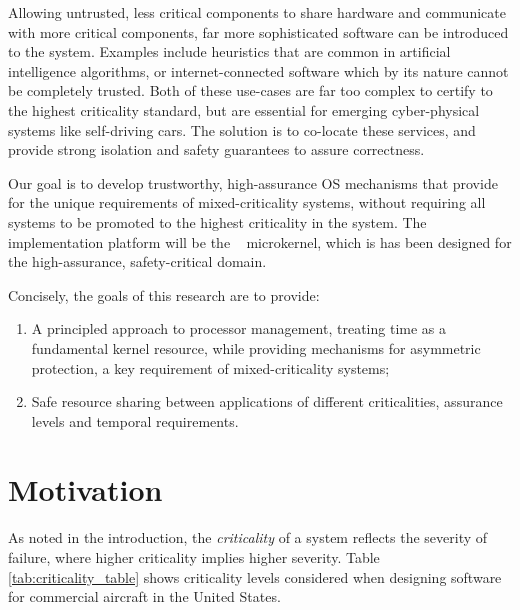 Allowing untrusted, less critical components to
share hardware and communicate with more critical components, far more sophisticated software can be
introduced to the system. Examples include heuristics that are common in artificial
intelligence algorithms, or internet-connected software which by its nature cannot be completely
trusted. Both of these use-cases are far too complex to certify to the highest criticality standard,
but are essential for emerging cyber-physical systems like self-driving cars. The solution is to
co-locate these services, and provide strong isolation and safety guarantees to assure
correctness.

Our goal is to develop trustworthy, high-assurance \gls{OS} mechanisms that provide for the unique
requirements of mixed-criticality systems, without requiring all systems to be promoted to the highest
criticality in the system. 
The implementation platform will be the \selfour~\citep{Klein_EHACDEEKNSTW_09}
microkernel, which is has been designed for the high-assurance, safety-critical domain.

Concisely, the goals of this research are to provide:
\begin{enumerate}[label=\textbf{G\arabic*}] 
    \item\label{G1} A principled approach to
    processor management, treating time as a fundamental kernel resource, while
    providing mechanisms for asymmetric protection, a key requirement of mixed-criticality systems;
\item\label{G2} Safe resource sharing between applications of different criticalities, assurance levels and
    temporal requirements.  
\end{enumerate}

\section{Motivation}
\label{sec:motivation}

As noted in the introduction, the \emph{criticality} of a system reflects the
severity of failure, where higher criticality implies higher severity.  Table
\ref{tab:criticality_table} shows criticality levels considered when designing
software for commercial aircraft in the United States.

